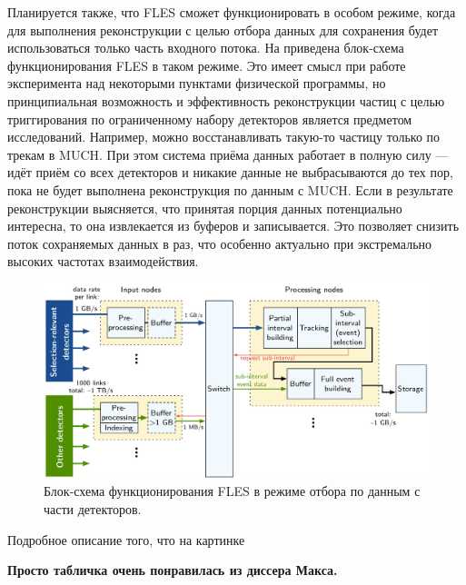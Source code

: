 Планируется также, что FLES сможет функционировать в особом режиме, когда для выполнения реконструкции с целью отбора данных для сохранения будет использоваться только часть входного потока. На  приведена блок-схема функционирования FLES в таком режиме. Это имеет смысл при работе эксперимента над некоторыми пунктами физической программы, но принципиальная возможность и эффективность реконструкции частиц с целью триггирования по ограниченному набору детекторов является предметом исследований. Например, можно восстанавливать \todo такую-то частицу только по трекам в MUCH. При этом система приёма данных работает в полную силу --- идёт приём со всех детекторов и никакие данные не выбрасываются до тех пор, пока не будет выполнена реконструкция по данным с MUCH. Если в результате реконструкции выясняется, что принятая порция данных потенциально интересна, то она извлекается из буферов и записывается. Это позволяет \todo снизить поток сохраняемых данных в \todo раз, что особенно актуально при экстремально высоких частотах взаимодействия.

\begin{figure}[H]
\centering
\includegraphics[width=1.0\textwidth]{pictures/PartialIB.png}
\caption{Блок-схема функционирования FLES в режиме отбора по данным с части детекторов.}
\label{fig:PartialIB}
\end{figure}

\todo Подробное описание того, что на картинке









\todo

\textbf{Просто табличка очень понравилась из диссера Макса.}


